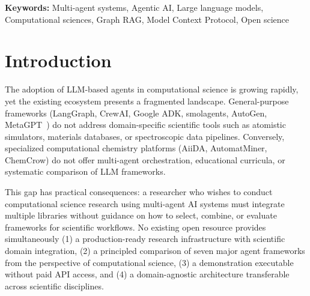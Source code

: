 \documentclass[11pt]{article}
\begin{document}
\begin{abstract}
The framework is validated through a non-trivial scientific application: Au$_{13}$ nanocluster research with a four-tool agentic pipeline (ASE/EMT geometry optimization, scikit-learn Gradient Boosting property prediction, Graph RAG literature retrieval, structured JSON reporting). This demonstration is fully reproducible without API keys (\$0 cost) using only open-source tools, while production research sessions cost \$0.01–\$0.05 with Gemini 2.5 Flash or \$0 with Ollama local inference. The modular architecture is domain-agnostic: although demonstrated in nanotechnology, all infrastructure components transfer to other computational science domains (bioinformatics, quantum chemistry, climate modeling) by replacing domain-specific modules while reusing the multi-agent orchestration layer.

\textbf{Cost accessibility:} executing the complete curriculum costs less than \$2 using OpenRouter with multi-provider LLM access, or \$0 with local Ollama inference. Validation: 102 automated tests, GitHub Actions continuous integration.

\end{abstract}

\noindent\textbf{Keywords:} Multi-agent systems, Agentic AI, Large language models, Computational sciences, Graph RAG, Model Context Protocol, Open science

\section{Introduction}

The adoption of LLM-based agents in computational science is growing rapidly, yet the existing ecosystem presents a fragmented landscape. General-purpose frameworks (LangGraph, CrewAI, Google ADK, smolagents, AutoGen, MetaGPT~\cite{metgpt2023}) do not address domain-specific scientific tools such as atomistic simulators, materials databases, or spectroscopic data pipelines. Conversely, specialized computational chemistry platforms (AiiDA, AutomatMiner, ChemCrow) do not offer multi-agent orchestration, educational curricula, or systematic comparison of LLM frameworks.

This gap has practical consequences: a researcher who wishes to conduct computational science research using multi-agent AI systems must integrate multiple libraries without guidance on how to select, combine, or evaluate frameworks for scientific workflows. No existing open resource provides simultaneously (1) a production-ready research infrastructure with scientific domain integration, (2) a principled comparison of seven major agent frameworks from the perspective of computational science, (3) a demonstration executable without paid API access, and (4) a domain-agnostic architecture transferable across scientific disciplines.
\end{document}
